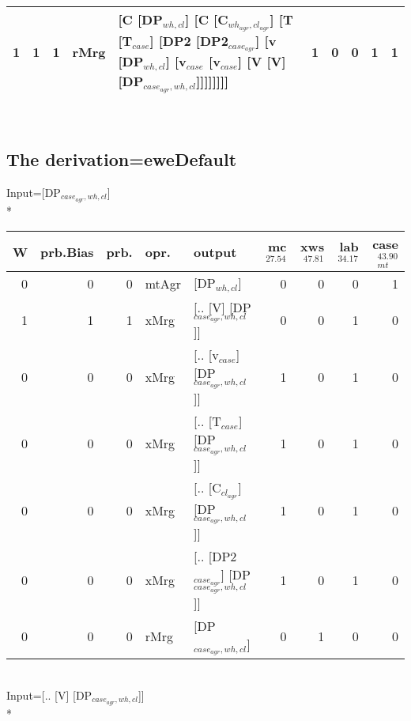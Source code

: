 \begin{tabularx}{\linewidth}{rrrlXrrrrr}
   1 &       1 &   1 & rMrg & [C [DP$_{wh,cl}$] [C [C$_{wh_{agr},cl_{agr}}$] [T [T$_{case}$] [DP2 [DP2$_{case_{agr}}$] [v [DP$_{wh,cl}$] [v$_{case}$ [v$_{case}$] [V [V] [DP$_{case_{agr},wh,cl}$]]]]]]]]                                                                                                     &             1 &             0 &                  0 &           1 &           1 \\
\hline
\end{tabularx}\endgroup\\
\subsection{The derivation=eweDefault}
\begingroup\scriptsize Input=[DP$_{case_{agr},wh,cl}$]\\*
\begin{tabularx}{\linewidth}{rrrlXrrrr}
\hline
   W &   prb.Bias &   prb. & opr.    & output                                  &   mc$^{27.54}$ &   xws$^{47.81}$ &   lab$^{34.17}$ &   case$_{mt}^{43.90}$ \\
\hline
   0 &       0 &   0 & mtAgr & [DP$_{wh,cl}$]                              &            0 &             0 &             0 &                 1 \\
   1 &       1 &   1 & xMrg  & [.. [V] [DP$_{case_{agr},wh,cl}$]]            &            0 &             0 &             1 &                 0 \\
   0 &       0 &   0 & xMrg  & [.. [v$_{case}$] [DP$_{case_{agr},wh,cl}$]]       &            1 &             0 &             1 &                 0 \\
   0 &       0 &   0 & xMrg  & [.. [T$_{case}$] [DP$_{case_{agr},wh,cl}$]]       &            1 &             0 &             1 &                 0 \\
   0 &       0 &   0 & xMrg  & [.. [C$_{cl_{agr}}$] [DP$_{case_{agr},wh,cl}$]]     &            1 &             0 &             1 &                 0 \\
   0 &       0 &   0 & xMrg  & [.. [DP2$_{case_{agr}}$] [DP$_{case_{agr},wh,cl}$]] &            1 &             0 &             1 &                 0 \\
   0 &       0 &   0 & rMrg  & [DP$_{case_{agr},wh,cl}$]                     &            0 &             1 &             0 &                 0 \\
\hline
\end{tabularx}\endgroup\\
\begingroup\scriptsize Input=[.. [V] [DP$_{case_{agr},wh,cl}$]]\\*
